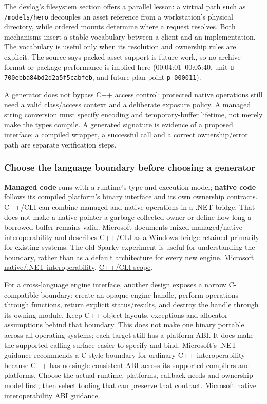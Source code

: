 The devlog's filesystem section offers a parallel lesson: a virtual path such as \texttt{/models/hero} decouples an asset reference from a workstation's physical directory, while ordered mounts determine where a request resolves. Both mechanisms insert a stable vocabulary between a client and an implementation. The vocabulary is useful only when its resolution and ownership rules are explicit. The source says packed-asset support is future work, so no archive format or package performance is implied here (00:04:01--00:05:40, unit \texttt{u-700ebba84bd2d2a5f5cabfeb}, and future-plan point \texttt{p-000011}).

A generator does not bypass C++ access control: protected native operations still need a valid class/access context and a deliberate exposure policy. A managed string conversion must specify encoding and temporary-buffer lifetime, not merely make the types compile. A generated signature is evidence of a proposed interface; a compiled wrapper, a successful call and a correct ownership/error path are separate verification steps.

\subsubsection{Choose the language boundary before choosing a generator}\label{choose-the-language-boundary-before-choosing-a-generator}

\textbf{Managed code} runs with a runtime's type and execution model; \textbf{native code} follows its compiled platform's binary interface and its own ownership contracts. C++/CLI can combine managed and native operations in a .NET bridge. That does not make a native pointer a garbage-collected owner or define how long a borrowed buffer remains valid. Microsoft documents mixed managed/native interoperability and describes C++/CLI as a Windows bridge retained primarily for existing systems. The old Sparky experiment is useful for understanding the boundary, rather than as a default architecture for every new engine. \href{https://learn.microsoft.com/en-us/cpp/dotnet/native-and-dotnet-interoperability}{Microsoft native/.NET interoperability}, \href{https://learn.microsoft.com/en-us/cpp/dotnet/}{C++/CLI scope}.

For a cross-language engine interface, another design exposes a narrow C-compatible boundary: create an opaque engine handle, perform operations through functions, return explicit status/results, and destroy the handle through its owning module. Keep C++ object layouts, exceptions and allocator assumptions behind that boundary. This does not make one binary portable across all operating systems; each target still has a platform ABI. It does make the supported calling surface easier to specify and bind. Microsoft's .NET guidance recommends a C-style boundary for ordinary C++ interoperability because C++ has no single consistent ABI across its supported compilers and platforms. Choose the actual runtime, platforms, callback needs and ownership model first; then select tooling that can preserve that contract. \href{https://learn.microsoft.com/dotnet/standard/native-interop/abi-support}{Microsoft native interoperability ABI guidance}.

